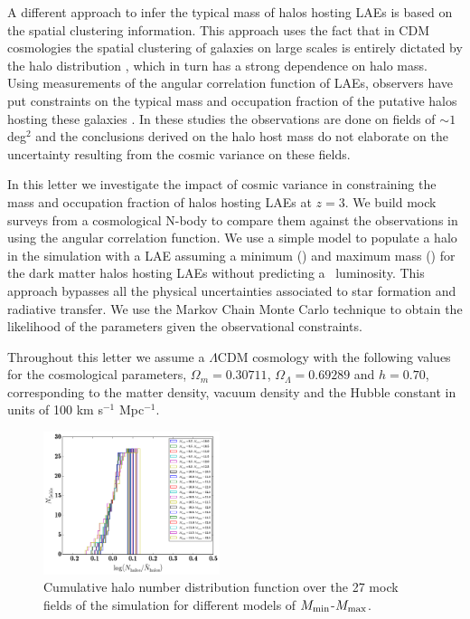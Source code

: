\documentclass{emulateapj}
\newcommand{\ly}{{\ifmmode{{\rm Ly}\alpha}\else{Ly$\alpha$}\fi}}
\newcommand{\mmin}{{\ifmmode{{M_{\rm min}}}\else{${M_{\rm min}}$}\fi}}
\newcommand{\mmax}{{\ifmmode{{M_{\rm max}}}\else{${M_{\rm max}}$}\fi}}
\begin{document}
A different approach to infer the typical mass of halos hosting
LAEs is based on the spatial clustering information. 
This approach uses the fact
that in CDM cosmologies the spatial clustering of galaxies on large
scales is entirely dictated by the halo distribution
\citep{Colberg00}, which in turn has a strong dependence on halo
mass. 
Using measurements of the angular correlation function of LAEs,
observers have put constraints on the typical mass and occupation
fraction of the putative halos hosting these galaxies
\citep{Hayashino2004,Gawiser07,Nilsson2007,Ouchi2010,Bielby16}. 
In these studies the observations are done on fields of $\sim 1$ deg$^{2}$ and
the conclusions derived on the halo host mass do not elaborate on the uncertainty resulting from the cosmic variance on these fields.

In this letter we investigate the impact of cosmic variance in
constraining the mass and occupation fraction of halos hosting LAEs at $z=3$.
We build mock surveys from a cosmological N-body to compare them against the observations in \cite{Bielby16} using the angular correlation function. 
We use a simple model to populate a halo in the simulation with a LAE   
assuming a minimum (\mmin) and maximum mass (\mmax) for the dark matter halos hosting LAEs without predicting a \ly\  luminosity. 
This approach bypasses all the physical uncertainties associated to star formation and radiative transfer.
We use the Markov Chain Monte Carlo technique to obtain the likelihood of the parameters given the observational constraints.

Throughout this letter we assume a $\Lambda$CDM cosmology with the
following values for the cosmological parameters, $\Omega_{m}=0.30711$,
$\Omega_{\Lambda}=0.69289$ and $h=0.70$, corresponding to the matter
density, vacuum density and the Hubble constant in units of 100 km
s$^{-1}$ Mpc$^{-1}$. 


\begin{figure}
\includegraphics[width=0.46\textwidth, height=0.38\textwidth]{ndist.png}
\caption{Cumulative halo number distribution function over the 27 mock fields of the simulation for different models of $M_{\rm min}$-$M_{\rm max}$.}
\label{fig:cosmicv0}
\end{figure}
\end{document}
